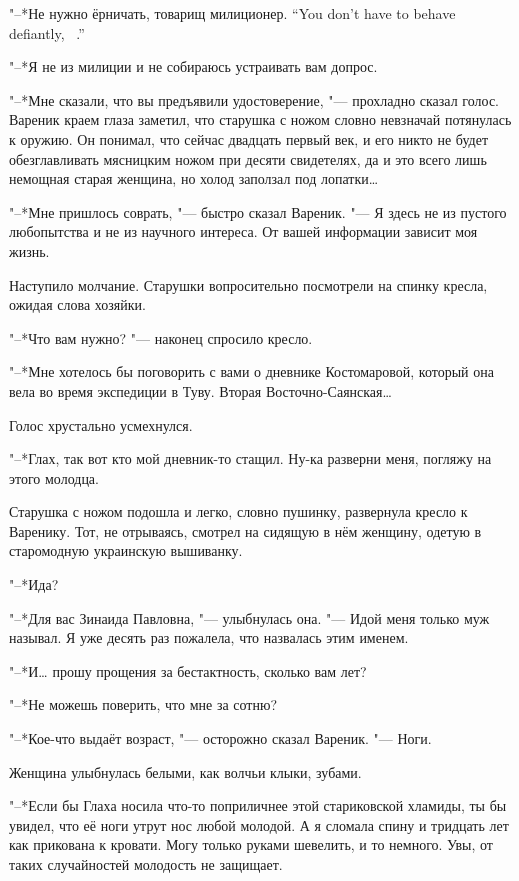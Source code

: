 {"--*Не нужно ёрничать, товарищ милиционер.}
{``You don't have to behave defiantly, \tovarisch\ \militsioner.''}

"--*Я не из милиции и не собираюсь устраивать вам допрос.

"--*Мне сказали, что вы предъявили удостоверение, "--- прохладно сказал голос.
Вареник краем глаза заметил, что старушка с ножом словно невзначай потянулась к оружию.
Он понимал, что сейчас двадцать первый век, и его никто не будет обезглавливать мясницким ножом при десяти свидетелях, да и это всего лишь немощная старая женщина, но холод заползал под лопатки\dots{}

"--*Мне пришлось соврать, "--- быстро сказал Вареник.
"--- Я здесь не из пустого любопытства и не из научного интереса.
От вашей информации зависит моя жизнь.

Наступило молчание.
Старушки вопросительно посмотрели на спинку кресла, ожидая слова хозяйки.

"--*Что вам нужно? "--- наконец спросило кресло.

"--*Мне хотелось бы поговорить с вами о дневнике Костомаровой, который она вела во время экспедиции в Туву.
Вторая Восточно-Саянская\dots{}

Голос хрустально усмехнулся.

"--*Глах, так вот кто мой дневник-то стащил.
Ну-ка разверни меня, погляжу на этого молодца.

Старушка с ножом подошла и легко, словно пушинку, развернула кресло к Варенику.
Тот, не отрываясь, смотрел на сидящую в нём женщину, одетую в старомодную украинскую вышиванку.

"--*Ида?

"--*Для вас Зинаида Павловна, "--- улыбнулась она.
"--- Идой меня только муж называл.
Я уже десять раз пожалела, что назвалась этим именем.

"--*И\dots{} прошу прощения за бестактность, сколько вам лет?

"--*Не можешь поверить, что мне за сотню?

"--*Кое-что выдаёт возраст, "--- осторожно сказал Вареник.
"--- Ноги.

Женщина улыбнулась белыми, как волчьи клыки, зубами.

"--*Если бы Глаха носила что-то поприличнее этой стариковской хламиды, ты бы увидел, что её ноги утрут нос любой молодой.
А я сломала спину и тридцать лет как прикована к кровати.
Могу только руками шевелить, и то немного.
Увы, от таких случайностей молодость не защищает.

